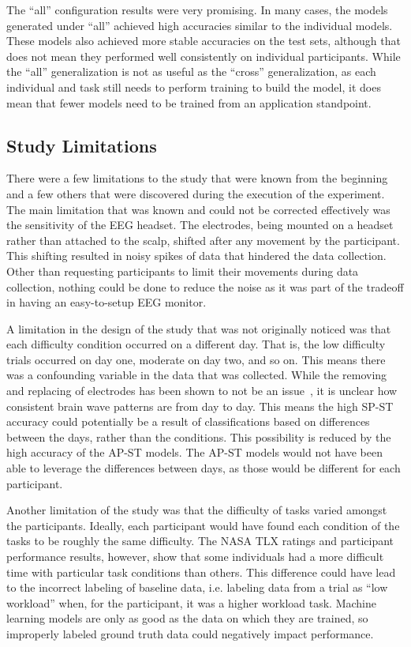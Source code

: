 \documentclass[11pt]{article}
\begin{document}
	The ``all'' configuration results were very promising. In many cases, the models generated under ``all'' achieved high accuracies similar to the individual models. These models also achieved more stable accuracies on the test sets, although that does not mean they performed well consistently on individual participants. While the ``all'' generalization is not as useful as the ``cross'' generalization, as each individual and task still needs to perform training to build the model, it does mean that fewer models need to be trained from an application standpoint.
		
	
	\subsection{Study Limitations}
	There were a few limitations to the study that were known from the beginning and a few others that were discovered during the execution of the experiment. The main limitation that was known and could not be corrected effectively was the sensitivity of the EEG headset. The electrodes, being mounted on a headset rather than attached to the scalp, shifted after any movement by the participant. This shifting resulted in noisy spikes of data that hindered the data collection. Other than requesting participants to limit their movements during data collection, nothing could be done to reduce the noise as it was part of the tradeoff in having an easy-to-setup EEG monitor.
	
	A limitation in the design of the study that was not originally noticed was that each difficulty condition occurred on a different day. That is, the low difficulty trials occurred on day one, moderate on day two, and so on. This means there was a confounding variable in the data that was collected. While the removing and replacing of electrodes has been shown to not be an issue~\cite{Christensen}, it is unclear how consistent brain wave patterns are from day to day. This means the high SP-ST accuracy could potentially be a result of classifications based on differences between the days, rather than the conditions. This possibility is reduced by the high accuracy of the AP-ST models. The AP-ST models would not have been able to leverage the differences between days, as those would be different for each participant.
	
	Another limitation of the study was that the difficulty of tasks varied amongst the participants. Ideally, each participant would have found each condition of the tasks to be roughly the same difficulty. The NASA TLX ratings and participant performance results, however, show that some individuals had a more difficult time with particular task conditions than others. This difference could have lead to the incorrect labeling of baseline data, i.e. labeling data from a trial as ``low workload'' when, for the participant, it was a higher workload task. Machine learning models are only as good as the data on which they are trained, so improperly labeled ground truth data could negatively impact performance.
	
\end{document}
